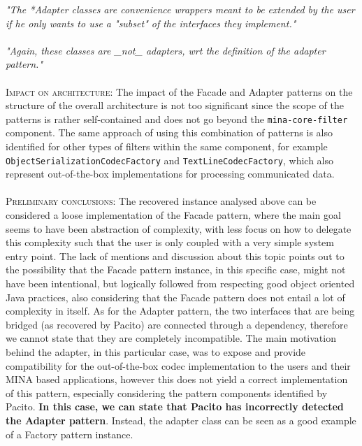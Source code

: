 \textit{"The *Adapter classes are convenience wrappers meant to be extended by the user if he only wants to use a "subset" of the interfaces they implement."}\\\\
\textit{"Again, these classes are \_not\_ adapters, wrt the definition of the 
adapter pattern."}\\\\
\textsc{Impact on architecture}: The impact of the Facade and Adapter patterns on the structure of the overall architecture is not too significant since the scope of the patterns is rather self-contained and does not go beyond the \texttt{mina-core-filter} component. The same approach of using this combination of patterns is also identified for other types of filters within the same component, for example \texttt{ObjectSerializationCodecFactory} and \texttt{TextLineCodecFactory}, which also represent out-of-the-box implementations for processing communicated data.\\\\
\textsc{Preliminary conclusions}: The recovered instance analysed above can be considered a loose implementation of the Facade pattern, where the main goal seems to have been abstraction of complexity, with less focus on how to delegate this complexity such that the user is only coupled with a very simple system entry point. The lack of mentions and discussion about this topic points out to the possibility that the Facade pattern instance, in this specific case, might not have been intentional, but logically followed from respecting good object oriented Java practices, also considering that the Facade pattern does not entail a lot of complexity in itself. As for the Adapter pattern, the two interfaces that are being bridged (as recovered by Pacito) are connected through a dependency, therefore we cannot state that they are completely incompatible. The main motivation behind the adapter, in this particular case, was to expose and provide compatibility for the out-of-the-box codec implementation to the users and their MINA based applications, however this does not yield a correct implementation of this pattern, especially considering the pattern components identified by Pacito. \textbf{In this case, we can state that Pacito has incorrectly detected the Adapter pattern}. Instead, the adapter class can be seen as a good example of a Factory pattern instance. 

